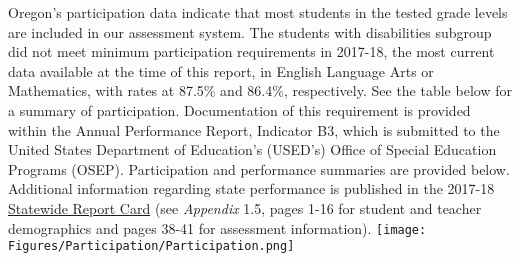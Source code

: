 \documentclass[]{article}
\begin{document}
Oregon's participation data indicate that most students in the tested
grade levels are included in our assessment system. The students with
disabilities subgroup did not meet minimum participation requirements in
2017-18, the most current data available at the time of this report, in
English Language Arts or Mathematics, with rates at 87.5\% and 86.4\%,
respectively. See the table below for a summary of participation.
Documentation of this requirement is provided within the Annual
Performance Report, Indicator B3, which is submitted to the United
States Department of Education's (USED's) Office of Special Education
Programs (OSEP). Participation and performance summaries are provided
below. Additional information regarding state performance is published
in the 2017-18
\color{link}\href{https://www.oregon.gov/ode/schools-and-districts/reportcards/reportcards/Pages/RC-Resource-Archives-1617-2021.aspx}{Statewide
Report Card} \color{black} (see \emph{Appendix} 1.5, pages 1-16 for
student and teacher demographics and pages 38-41 for assessment
information).\FloatBarrier
\texttt{[image: Figures/Participation/Participation.png]}
\end{document}
